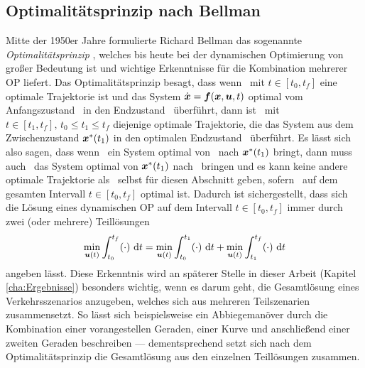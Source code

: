 \subsection{Optimalitätsprinzip nach Bellman}\label{subsec:Optimalitätsprinzip}
Mitte der 1950er Jahre formulierte Richard Bellman das sogenannte \textit{Optimalitätsprinzip} \cite{Bellman.1984}, welches bis heute bei der dynamischen Optimierung von großer Bedeutung ist und wichtige Erkenntnisse für die Kombination mehrerer \gls{OP} liefert. Das Optimalitätsprinzip besagt, dass wenn \uoptoft~mit $t\in[t_0, t_f]$ eine optimale Trajektorie ist und das System $\dot{\boldsymbol{x}} = \boldsymbol{f}(\boldsymbol{x},\boldsymbol{u},t)$ optimal vom Anfangszustand \xoftzero~in den Endzustand \xoptoftf~überführt, dann ist \uoptoft~mit $t\in[t_1, t_f],\, t_0\leq t_1\leq t_f$ diejenige optimale Trajektorie, die das System aus dem Zwischenzustand ${\boldsymbol{x}}^*(t_1)$ in den optimalen Endzustand \xoptoftf~überführt. Es lässt sich also sagen, dass wenn \uoptoft~ein System optimal von \xoftzero~nach ${\boldsymbol{x}}^*(t_1)$ bringt, dann muss auch \uoptoft~das System optimal von ${\boldsymbol{x}}^*(t_1)$ nach \xoptoftf~bringen und es kann keine andere optimale Trajektorie als \uoptoft~selbst für diesen Abschnitt geben, sofern \uoptoft~auf dem gesamten Intervall $t\in[t_0, t_f]$ optimal ist. Dadurch ist sichergestellt, dass sich die Lösung eines dynamischen \gls{OP} auf dem Intervall $t\in[t_0, t_f]$ immer durch zwei (oder mehrere) Teillösungen 
\begin{equation}
	\min_{\boldsymbol{u}(t)} \int_{t_0}^{t_f}(\cdot)~\textrm{d}{t} = \min_{\boldsymbol{u}(t)} \int_{t_0}^{t_1}(\cdot)~\textrm{d}{t} + \min_{\boldsymbol{u}(t)} \int_{t_1}^{t_f}(\cdot)~\textrm{d}{t}
\end{equation}
angeben lässt. Diese Erkenntnis wird an späterer Stelle in dieser Arbeit (Kapitel \ref{cha:Ergebnisse}) besonders wichtig, wenn es darum geht, die Gesamtlösung eines Verkehrsszenarios anzugeben, welches sich aus mehreren Teilszenarien zusammensetzt. So lässt sich beispielsweise ein Abbiegemanöver durch die Kombination einer vorangestellen Geraden, einer Kurve und anschließend einer zweiten Geraden beschreiben --- dementsprechend setzt sich nach dem Optimalitätsprinzip die Gesamtlösung aus den einzelnen Teillösungen zusammen.
